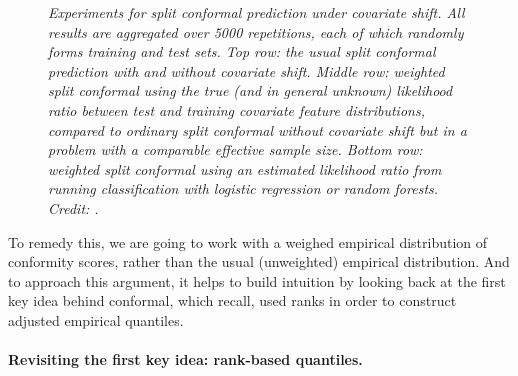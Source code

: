 \documentclass{article}
\begin{document}
\begin{figure}[htb]
\caption{\it Experiments for split conformal prediction under covariate
  shift. All results are aggregated over 5000 repetitions, each of which
  randomly forms training and test sets. Top row: the usual split conformal
  prediction with and without covariate shift. Middle row: weighted split
  conformal using the true (and in general unknown) likelihood ratio between
  test and training covariate feature distributions, compared to ordinary split 
  conformal without covariate shift but in a problem with a comparable effective 
  sample size. Bottom row: weighted split conformal using an estimated
  likelihood ratio from running classification with logistic regression or
  random forests. Credit: \citet{tibshirani2019conformal}.}       
\label{fig:airfoil}
\end{figure}

To remedy this, we are going to work with a weighed empirical distribution of 
conformity scores, rather than the usual (unweighted) empirical distribution. 
And to approach this argument, it helps to build intuition by looking back at
the first key idea behind conformal, which recall, used ranks in order to
construct adjusted empirical quantiles. 

\paragraph{Revisiting the first key idea: rank-based quantiles.}

\def\Quantile{\mathrm{Quantile}}
\end{document}
